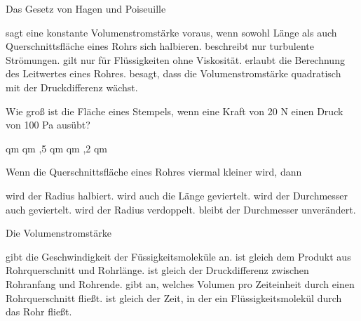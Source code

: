 \documentclass[11pt]{exam}
\begin{document}
\setlength{\voffset}{-0.5in}
\setlength{\headsep}{5pt}

\hspace{2mm}
 \hspace{5mm}
\vspace{4mm}

\begin{questions}

\question Das Gesetz von Hagen und Poiseuille

\begin{choices}
	\choice sagt eine konstante Volumenstromstärke voraus, wenn sowohl Länge als auch Querschnittsfläche eines Rohrs sich halbieren.
	\choice beschreibt nur turbulente Strömungen.
	\choice gilt nur für Flüssigkeiten ohne Viskosität.
	\choice erlaubt die Berechnung des Leitwertes eines Rohres.
	\choice besagt, dass die Volumenstromstärke quadratisch mit der Druckdifferenz wächst.
\end{choices}

\vspace{3mm}\question Wie groß ist die Fläche eines Stempels, wenn eine Kraft von 20 N einen Druck von 100 Pa ausübt?

\begin{choices}
	 qm
	 qm
	,5 qm
	 qm
	,2 qm
\end{choices}

\vspace{3mm}\question Wenn die Querschnittsfläche eines Rohres viermal kleiner wird, dann

\begin{choices}
	\choice wird der Radius halbiert.
	\choice wird auch die Länge geviertelt.
	\choice wird der Durchmesser auch geviertelt.
	\choice wird der Radius verdoppelt.
	\choice bleibt der Durchmesser unverändert.
\end{choices}

\vspace{3mm}\question Die Volumenstromstärke

\begin{choices}
	\choice gibt die Geschwindigkeit der Füssigkeitsmoleküle an.
	\choice ist gleich dem Produkt aus Rohrquerschnitt und Rohrlänge.
	\choice ist gleich der Druckdifferenz zwischen Rohranfang und Rohrende.
	\choice gibt an, welches Volumen pro Zeiteinheit durch einen Rohrquerschnitt fließt.
	\choice ist gleich der Zeit, in der ein Flüssigkeitsmolekül durch das Rohr fließt.
\end{choices}


\end{questions}
\end{document}
